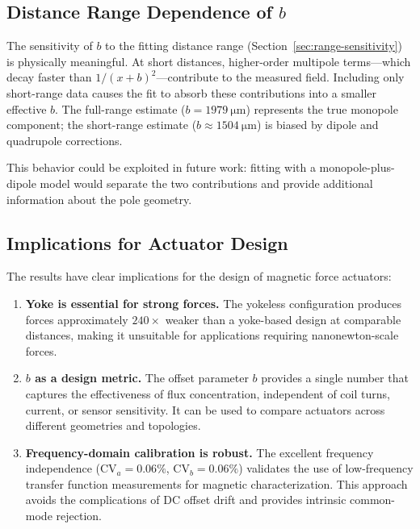 \subsection{Distance Range Dependence of $b$}

The sensitivity of $b$ to the fitting distance range
(Section~\ref{sec:range-sensitivity}) is physically meaningful. At short
distances, higher-order multipole terms---which decay faster than
$1/(x+b)^2$---contribute to the measured field. Including only short-range
data causes the fit to absorb these contributions into a smaller effective
$b$. The full-range estimate ($b = \SI{1979}{\um}$) represents the true
monopole component; the short-range estimate ($b \approx \SI{1504}{\um}$)
is biased by dipole and quadrupole corrections.

This behavior could be exploited in future work: fitting with a
monopole-plus-dipole model would separate the two contributions and provide
additional information about the pole geometry.

\subsection{Implications for Actuator Design}

The results have clear implications for the design of magnetic force actuators:

\begin{enumerate}
\item \textbf{Yoke is essential for strong forces.} The yokeless configuration
produces forces approximately $240\times$ weaker than a yoke-based design at
comparable distances, making it unsuitable for applications requiring
nanonewton-scale forces.

\item \textbf{$b$ as a design metric.} The offset parameter $b$ provides a
single number that captures the effectiveness of flux concentration,
independent of coil turns, current, or sensor sensitivity. It can be used
to compare actuators across different geometries and topologies.

\item \textbf{Frequency-domain calibration is robust.} The excellent frequency
independence ($\mathrm{CV}_a = 0.06\%$, $\mathrm{CV}_b = 0.06\%$) validates
the use of low-frequency transfer function measurements for magnetic
characterization. This approach avoids the complications of DC offset drift
and provides intrinsic common-mode rejection.
\end{enumerate}
